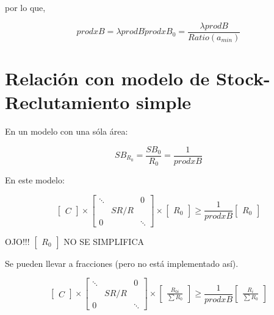 \documentclass[12pt, oneside, a4paper]{article}
\begin{document}
por lo que,

\begin{equation}
       prodxB = \lambda prod B \dot prodxB_{0} = \frac{\lambda prod B}{Ratio(a_{min})}
\end{equation}

\section{Relación con modelo de Stock-Reclutamiento simple}

En un modelo con una sóla área:

\begin{equation}
SB_{R_{0}}= \frac{SB_{0}}{R_{0}}= \frac{1}{prodxB}
\end{equation}

En este modelo:

\begin{equation}
    \begin{bmatrix} C \end{bmatrix} \times \begin{bmatrix} \ddots& & 0 \\ & SR/R & \\ 0 & & \ddots\end{bmatrix} \times \begin{bmatrix} R_{0} \end{bmatrix} \geq \frac{1}{prodxB} \begin{bmatrix} R_{0} \end{bmatrix}
\end{equation}

OJO!!! $\begin{bmatrix} R_{0} \end{bmatrix}$ NO SE SIMPLIFICA

Se pueden llevar a fracciones (pero no está implementado así).

\begin{equation}
    \begin{bmatrix} C \end{bmatrix} \times \begin{bmatrix} \ddots& & 0 \\ & SR/R & \\ 0 & & \ddots\end{bmatrix} \times \begin{bmatrix} \frac{R_{0i}}{\sum R_{0}} \end{bmatrix} \geq \frac{1}{prodxB} \begin{bmatrix} \frac{R_{i}}{\sum R_{0}} \end{bmatrix}
\end{equation}
\end{document}
